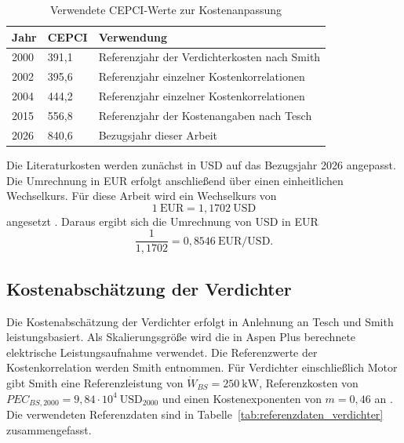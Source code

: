 \begin{table}[H]
\centering
\caption{Verwendete CEPCI-Werte zur Kostenanpassung}
\label{tab:cepci_werte}
\begin{tabular}{lll}
\hline
Jahr & CEPCI & Verwendung \\
\hline
2000 & 391{,}1 & Referenzjahr der Verdichterkosten nach Smith \cite{smithChemicalProcessDesign} \\
2002 & 395{,}6 & Referenzjahr einzelner Kostenkorrelationen \\
2004 & 444{,}2 & Referenzjahr einzelner Kostenkorrelationen \\
2015 & 556{,}8 & Referenzjahr der Kostenangaben nach Tesch \cite{teschExergybasedMethodsApplied} \\
2026 & 840{,}6 & Bezugsjahr dieser Arbeit \cite{PlantCostIndex2014} \\
\hline
\end{tabular}
\end{table}

Die Literaturkosten werden zunächst in USD auf das Bezugsjahr 2026 angepasst. Die Umrechnung in EUR erfolgt anschließend über einen einheitlichen Wechselkurs. Für diese Arbeit wird ein Wechselkurs von
\begin{equation}
1~\mathrm{EUR} = 1{,}1702~\mathrm{USD}
\end{equation}
angesetzt \cite{bank_euro_2026}. Daraus ergibt sich die Umrechnung von USD in EUR
\begin{equation}
\frac{1}{1{,}1702} = 0{,}8546~\mathrm{EUR/USD}.
\end{equation}

\subsection*{Kostenabschätzung der Verdichter}

Die Kostenabschätzung der Verdichter erfolgt in Anlehnung an Tesch \cite{teschExergybasedMethodsApplied} und Smith \cite{smithChemicalProcessDesign} leistungsbasiert. Als Skalierungsgröße wird die in Aspen Plus berechnete elektrische Leistungsaufnahme verwendet. Die Referenzwerte der Kostenkorrelation werden Smith entnommen. Für Verdichter einschließlich Motor gibt Smith eine Referenzleistung von $\dot W_{BS}=250~\mathrm{kW}$, Referenzkosten von $PEC_{BS,2000}=9{,}84 \cdot 10^4~\mathrm{USD}_{2000}$ und einen Kostenexponenten von $m=0{,}46$ an \cite{smith_chemical_nodate}. Die verwendeten Referenzdaten sind in Tabelle~\ref{tab:referenzdaten_verdichter} zusammengefasst.

